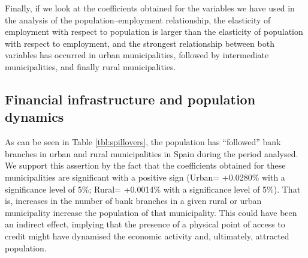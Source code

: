 \documentclass[a4paper,11pt,oneside]{article}
\begin{document}
Finally, if we look at the coefficients obtained for the variables we have used in the analysis of the population--employment relationship, the elasticity of employment with respect to population is larger than the elasticity of population with respect to employment, and the strongest relationship between both variables has occurred in urban municipalities, followed by intermediate municipalities, and finally rural municipalities.






\subsection{Financial infrastructure and population dynamics}
\label{sec:financial_infrastructure}





As can be seen in Table \ref{tbl:spillovers}, the population has ``followed'' bank branches in urban and rural municipalities in Spain during the period analysed. We support this assertion by the fact that the coefficients obtained for these municipalities are significant with a positive sign (Urban= +0.0280\% with a significance level of 5\%; Rural= +0.0014\% with a significance level of 5\%). That is, increases in the number of bank branches in a given rural or urban municipality increase the population of that municipality. This could have been an indirect effect, implying that the presence of a physical point of access to credit might have dynamised the economic activity and, ultimately, attracted population.
\end{document}
